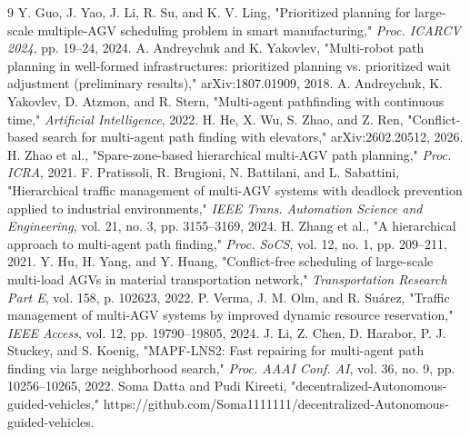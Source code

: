 \documentclass[conference]{IEEEtran}
\begin{document}
\begin{thebibliography}{9}
 Y. Guo, J. Yao, J. Li, R. Su, and K. V. Ling, "Prioritized planning for large-scale multiple-AGV scheduling problem in smart manufacturing," \emph{Proc. ICARCV 2024}, pp. 19--24, 2024.
 A. Andreychuk and K. Yakovlev, "Multi-robot path planning in well-formed infrastructures: prioritized planning vs. prioritized wait adjustment (preliminary results)," arXiv:1807.01909, 2018.
 A. Andreychuk, K. Yakovlev, D. Atzmon, and R. Stern, "Multi-agent pathfinding with continuous time," \emph{Artificial Intelligence}, 2022.
 H. He, X. Wu, S. Zhao, and Z. Ren, "Conflict-based search for multi-agent path finding with elevators," arXiv:2602.20512, 2026.
 H. Zhao et al., "Spare-zone-based hierarchical multi-AGV path planning," \emph{Proc. ICRA}, 2021.
 F. Pratissoli, R. Brugioni, N. Battilani, and L. Sabattini, "Hierarchical traffic management of multi-AGV systems with deadlock prevention applied to industrial environments," \emph{IEEE Trans. Automation Science and Engineering}, vol. 21, no. 3, pp. 3155--3169, 2024.
 H. Zhang et al., "A hierarchical approach to multi-agent path finding," \emph{Proc. SoCS}, vol. 12, no. 1, pp. 209--211, 2021.
 Y. Hu, H. Yang, and Y. Huang, "Conflict-free scheduling of large-scale multi-load AGVs in material transportation network," \emph{Transportation Research Part E}, vol. 158, p. 102623, 2022.
 P. Verma, J. M. Olm, and R. Suárez, "Traffic management of multi-AGV systems by improved dynamic resource reservation," \emph{IEEE Access}, vol. 12, pp. 19790--19805, 2024.
 J. Li, Z. Chen, D. Harabor, P. J. Stuckey, and S. Koenig, "MAPF-LNS2: Fast repairing for multi-agent path finding via large neighborhood search," \emph{Proc. AAAI Conf. AI}, vol. 36, no. 9, pp. 10256--10265, 2022.
 Soma Datta and Pudi Kireeti, "decentralized-Autonomous-guided-vehicles," https://github.com/Soma1111111/decentralized-Autonomous-guided-vehicles.
\end{thebibliography}
\end{document}
